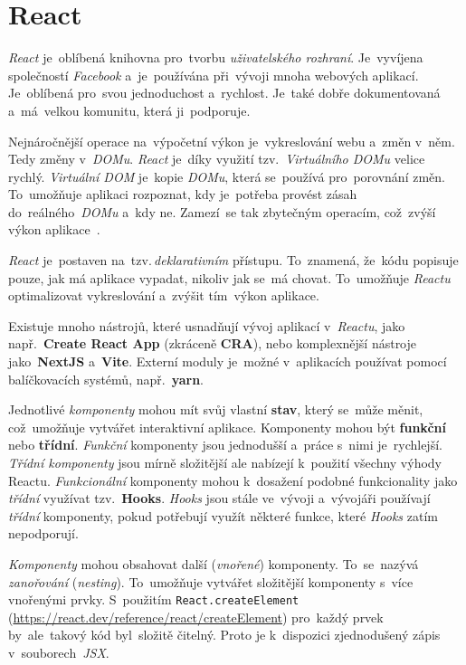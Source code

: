 \documentclass[11pt,a4paper]{report}
\begin{document}
        \section{React}
            \emph{React} je~oblíbená knihovna pro~tvorbu \emph{uživatelského rozhraní}. Je~vyvíjena společností \emph{Facebook} a~je~používána při~vývoji mnoha webových aplikací. Je~oblíbená pro~svou jednoduchost a~rychlost. Je~také dobře dokumentovaná a~má~velkou komunitu, která ji~podporuje.
            
            Nejnáročnější operace na~výpočetní výkon je~vykreslování webu a~změn v~něm. Tedy změny v~\emph{DOMu}. \emph{React} je~díky využití tzv.~\emph{Virtuálního DOMu} velice rychlý. \emph{Virtuální DOM} je~kopie \emph{DOMu}, která se~používá pro~porovnání změn. To~umožňuje aplikaci rozpoznat, kdy je~potřeba provést zásah do~reálného~\emph{DOMu} a~kdy ne. Zamezí~se tak zbytečným operacím, což~zvýší výkon aplikace~\cite{elrom2021react}.
            
            \emph{React} je~postaven na~tzv.\,\emph{deklarativním} přístupu. To~znamená, že~kódu popisuje pouze, jak má aplikace vypadat, nikoliv jak se~má chovat. To~umožňuje \emph{Reactu} optimalizovat vykreslování a~zvýšit tím~výkon aplikace.
            
            Existuje mnoho nástrojů, které usnadňují vývoj aplikací v~\emph{Reactu}, jako např.~\textbf{Create React App} (zkráceně \textbf{CRA}), nebo komplexnější nástroje jako~\textbf{NextJS} a~\textbf{Vite}. Externí moduly je~možné v~aplikacích používat pomocí balíčkovacích systémů, např.~\textbf{yarn}.

            Jednotlivé \emph{komponenty} mohou mít svůj vlastní \textbf{stav}, který se~může měnit, což~umožňuje vytvářet interaktivní aplikace. Komponenty mohou být \textbf{funkční} nebo \textbf{třídní}. \emph{Funkční} komponenty jsou jednodušší a~práce s~nimi je~rychlejší. \emph{Třídní komponenty} jsou mírně složitější ale nabízejí k~použití všechny výhody Reactu. \emph{Funkcionální} komponenty mohou k~dosažení podobné funkcionality jako \emph{třídní} využívat tzv.~\textbf{Hooks}. \emph{Hooks} jsou stále ve~vývoji a~vývojáři používají \emph{třídní} komponenty, pokud potřebují využít některé funkce, které \emph{Hooks} zatím nepodporují.

            \emph{Komponenty} mohou obsahovat další (\emph{vnořené}) komponenty. To~se~nazývá \emph{zanořování} (\emph{nesting}). To~umožňuje vytvářet složitější komponenty s~více vnořenými prvky. S~použitím \texttt{React.createElement} (\url{https://react.dev/reference/react/createElement}) pro~každý prvek by~ale~takový kód byl~složitě čitelný. Proto je k~dispozici zjednodušený zápis v~souborech~\emph{JSX}.
\end{document}
